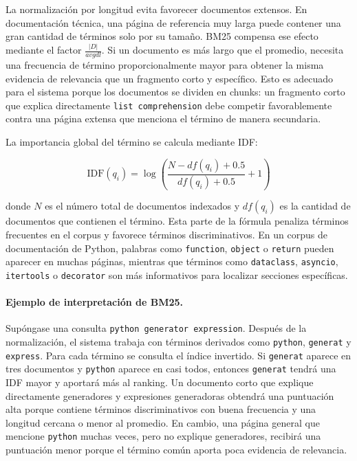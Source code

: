 \documentclass[11pt]{article}
\begin{document}
La normalización por longitud evita favorecer documentos extensos. En documentación técnica, una
página de referencia muy larga puede contener una gran cantidad de términos solo por su tamaño.
BM25 compensa ese efecto mediante el factor \(\frac{|D|}{avgdl}\). Si un documento es más largo
que el promedio, necesita una frecuencia de término proporcionalmente mayor para obtener la misma
evidencia de relevancia que un fragmento corto y específico. Esto es adecuado para el sistema
porque los documentos se dividen en chunks: un fragmento corto que explica directamente
\texttt{list comprehension} debe competir favorablemente contra una página extensa que menciona
el término de manera secundaria.

La importancia global del término se calcula mediante IDF:

\[
\mathrm{IDF}(q_i)=
\log\left(
\frac{N-df(q_i)+0.5}{df(q_i)+0.5}+1
\right)
\]

donde \(N\) es el número total de documentos indexados y \(df(q_i)\) es la cantidad de documentos
que contienen el término. Esta parte de la fórmula penaliza términos frecuentes en el corpus y
favorece términos discriminativos. En un corpus de documentación de Python, palabras como
\texttt{function}, \texttt{object} o \texttt{return} pueden aparecer en muchas páginas, mientras
que términos como \texttt{dataclass}, \texttt{asyncio}, \texttt{itertools} o \texttt{decorator}
son más informativos para localizar secciones específicas.

\paragraph{Ejemplo de interpretación de BM25.}
Supóngase una consulta \texttt{python generator expression}. Después de la normalización, el
sistema trabaja con términos derivados como \texttt{python}, \texttt{generat} y
\texttt{express}. Para cada término se consulta el índice invertido. Si \texttt{generat} aparece
en tres documentos y \texttt{python} aparece en casi todos, entonces \texttt{generat} tendrá una
IDF mayor y aportará más al ranking. Un documento corto que explique directamente generadores y
expresiones generadoras obtendrá una puntuación alta porque contiene términos discriminativos
con buena frecuencia y una longitud cercana o menor al promedio. En cambio, una página general
que mencione \texttt{python} muchas veces, pero no explique generadores, recibirá una puntuación
menor porque el término común aporta poca evidencia de relevancia.
\end{document}
